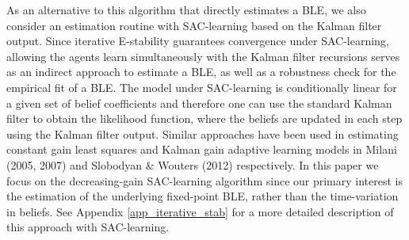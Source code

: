 As an alternative to this algorithm that directly estimates a BLE, we also consider an estimation routine with SAC-learning based on the Kalman filter output. 
Since iterative E-stability guarantees convergence under SAC-learning, allowing the agents learn simultaneously with the Kalman filter recursions serves as an indirect approach to estimate a BLE, as well as a robustness check for the empirical fit of a BLE. The model under SAC-learning is conditionally linear for a given set of belief coefficients and therefore one can use the standard Kalman filter to obtain the likelihood function, where the beliefs are updated in each step using the Kalman filter output. Similar approaches have been used in estimating constant gain least squares and Kalman gain adaptive learning models in Milani (2005, 2007) and Slobodyan \& Wouters (2012) respectively. In this paper we focus on the decreasing-gain SAC-learning algorithm since our primary interest is the estimation of the underlying fixed-point BLE, rather than the time-variation in beliefs. See Appendix \ref{app_iterative_stab} for a more detailed description of this approach with SAC-learning.